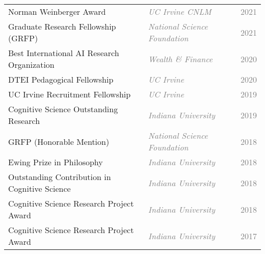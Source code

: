 \documentclass[10pt]{cooperCV2}
\begin{document}
\begin{longtable}{ l l @{\extracolsep{\fill}}  l @{}}
	 
	Norman Weinberger Award & \textit{\textcolor{gray}{UC Irvine CNLM}}  & \textcolor{grey}{2021} \\
	 
	Graduate Research Fellowship (GRFP) & \textit{\textcolor{gray}{National Science Foundation}}  & \textcolor{grey}{2021} \\
	 
	Best International AI Research Organization & \textit{\textcolor{gray}{Wealth \& Finance}}  & \textcolor{grey}{2020} \\
	 
	DTEI Pedagogical Fellowship & \textit{\textcolor{gray}{UC Irvine}}  & \textcolor{grey}{2020} \\
	 
	UC Irvine Recruitment Fellowship & \textit{\textcolor{gray}{UC Irvine}}  & \textcolor{grey}{2019} \\
	 
	Cognitive Science Outstanding Research & \textit{\textcolor{gray}{Indiana University}}  & \textcolor{grey}{2019} \\
	 
	GRFP (Honorable Mention) & \textit{\textcolor{gray}{National Science Foundation}}  & \textcolor{grey}{2018} \\
	 
	Ewing Prize in Philosophy & \textit{\textcolor{gray}{Indiana University}}  & \textcolor{grey}{2018} \\
	 
	Outstanding Contribution in Cognitive Science & \textit{\textcolor{gray}{Indiana University}}  & \textcolor{grey}{2018} \\
	 
	Cognitive Science Research Project Award & \textit{\textcolor{gray}{Indiana University}}  & \textcolor{grey}{2018} \\
	 
	Cognitive Science Research Project Award & \textit{\textcolor{gray}{Indiana University}}  & \textcolor{grey}{2017} \\
	
\end{longtable}










%	
\end{document}
